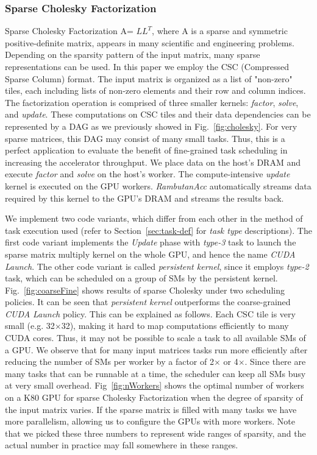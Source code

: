 \subsubsection{Sparse Cholesky Factorization}
Sparse Cholesky Factorization A= $LL^T$, where A is a sparse and symmetric positive-definite matrix,
appears in many scientific and engineering problems.
Depending on the sparsity pattern of the input matrix, many sparse representations can be used.
In this paper we employ the CSC (Compressed Sparse Column) format. 
The input matrix is organized as a list of "non-zero" tiles, each including lists of non-zero elements and their row and column indices.
The factorization operation is comprised of three smaller kernels: {\em factor}, {\em solve}, and {\em update}.
These computations on CSC tiles and their data dependencies can be represented by a DAG as we previously showed in Fig.~\ref{fig:cholesky}. 
For very sparse matrices, this DAG may consist of many small tasks.
Thus, this is a perfect application to evaluate the benefit of fine-grained task scheduling in increasing the accelerator throughput.
We place data on the host's DRAM and execute {\em factor} and {\em solve} on the host's worker.
The compute-intensive {\em update} kernel is executed on the GPU workers.
{\em RambutanAcc} automatically streams data required by this kernel to the GPU's DRAM and streams the results back.

We implement two code variants, which differ from each other in the method of task execution used (refer to Section~\ref{sec:task-def} for {\em task type} descriptions).
The first code variant implements the {\em Update} phase with {\em type-3} task to launch the sparse matrix multiply kernel on the whole GPU, and hence the name {\em CUDA Launch}.
The other code variant is called {\em persistent kernel}, since it employs {\em type-2} task, which can be scheduled on a group of SMs by the persistent kernel.
Fig.~\ref{fig:coarseFine} shows results of sparse Cholesky under two scheduling policies.
It can be seen that {\em persistent kernel} outperforms the coarse-grained {\em CUDA Launch} policy.
This can be explained as follows.
Each CSC tile is very small (e.g. 32$\times$32), making it hard to map computations efficiently to many CUDA cores.
Thus, it may not be possible to scale a task to all available SMs of a GPU.
We observe that for many input matrices tasks run more efficiently after reducing the number of SMs per worker by a factor of 2$\times$ or 4$\times$.
Since there are many tasks that can be runnable at a time, the scheduler can keep all SMs busy at very small overhead.
Fig~\ref{fig:nWorkers} shows the optimal number of workers on a K80 GPU for sparse Cholesky Factorization when the degree of sparsity of the input matrix varies.
If the sparse matrix is filled with many tasks we have more parallelism, allowing us to configure the GPUs with more workers.
Note that we picked these three numbers to represent wide ranges of sparsity, and the actual number in practice may fall somewhere in these ranges. 


